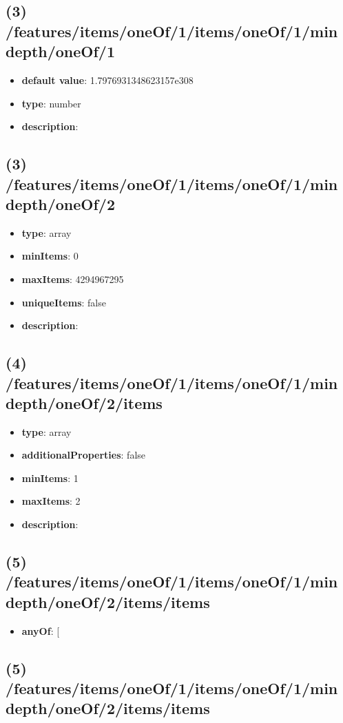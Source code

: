\subsection{(3) /features/items/oneOf/1/items/oneOf/1/min depth/oneOf/1}
\begin{itemize}[leftmargin=3em]\item {\bf default value}: 1.7976931348623157e308
\item {\bf type}: number
\item {\bf description}: 
\end{itemize}\subsection{(3) /features/items/oneOf/1/items/oneOf/1/min depth/oneOf/2}
\begin{itemize}[leftmargin=3em]\item {\bf type}: array
\item {\bf minItems}: 0
\item {\bf maxItems}: 4294967295
\item {\bf uniqueItems}: false
\item {\bf description}: 
\end{itemize}\subsection{(4) /features/items/oneOf/1/items/oneOf/1/min depth/oneOf/2/items}
\begin{itemize}[leftmargin=4em]\item {\bf type}: array
\item {\bf additionalProperties}: false
\item {\bf minItems}: 1
\item {\bf maxItems}: 2
\item {\bf description}: 
\end{itemize}\subsection{(5) /features/items/oneOf/1/items/oneOf/1/min depth/oneOf/2/items/items}
\begin{itemize}[leftmargin=5em]\item {\bf anyOf}: [\end{itemize}\subsection{(5) /features/items/oneOf/1/items/oneOf/1/min depth/oneOf/2/items/items}
